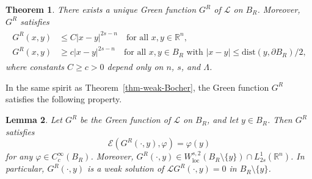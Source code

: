 \documentclass[11pt]{amsart}
\theoremstyle{plain}
\newtheorem{theorem}{Theorem}[section]
\newtheorem{lemma}[theorem]{Lemma}
\theoremstyle{definition}
\numberwithin{equation}{section}
\begin{document}
\begin{theorem}\label{thm-Green}
There exists a unique Green function $G^R$ of $\mathcal{L}$ on $B_R$. Moreover, $G^R$ satisfies
\begin{align}\label{eq-Green-est}
\begin{split}
G^R(x, y) &\leq C |x-y|^{2s-n} \quad\text{for all }x, y \in \mathbb{R}^n, \\
G^R(x, y) &\geq c |x-y|^{2s-n} \quad\text{for all }x, y \in B_R \text{ with }|x-y| \leq \mathrm{dist}(y, \partial B_R)/2,
\end{split}
\end{align}
where constants $C\geq c>0$ depend only on $n$, $s$, and $\Lambda$.
\end{theorem}

In the same spirit as Theorem~\ref{thm-weak-Bocher}, the Green function $G^R$ satisfies the following property.

\begin{lemma}\label{lem-Green-weak}
Let $G^R$ be the Green function of $\mathcal{L}$ on $B_R$, and let $y \in B_R$. Then $G^R$ satisfies
\begin{equation*}
\mathcal{E}(G^R(\cdot, y), \varphi) = \varphi(y)
\end{equation*}
for any $\varphi \in C^\infty_c(B_R)$. Moreover, $G^R(\cdot, y) \in W^{s, 2}_{\mathrm{loc}}(B_R \setminus \{y\}) \cap L^1_{2s}(\mathbb{R}^n)$. In particular, $G^R(\cdot, y)$ is a weak solution of $\mathcal{L}G^R(\cdot, y)=0$ in $B_R \setminus \{y\}$.
\end{lemma}
\end{document}
